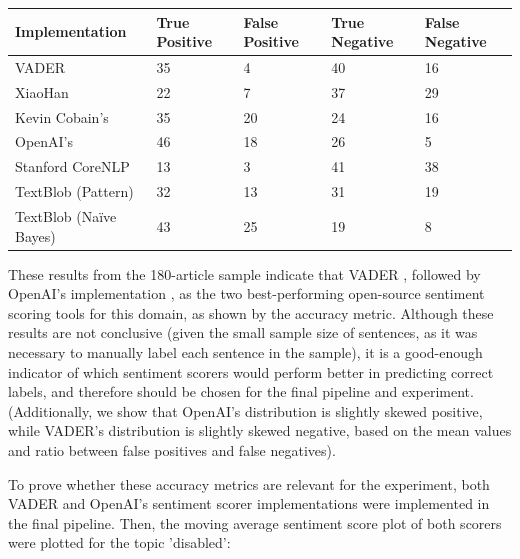 \documentclass{report}
\begin{document}
\vspace{0.5em}
\noindent
\begin{tabu} to 1.0\textwidth { | X[c] | X[c] | X[c] | X[c] | X[c] |}
	\hline
	Implementation & True Positive & False Positive & True Negative & False Negative \\
	\hline
	VADER \cite{VADER} & 35 & 4 & 40 & 16 \\
	\hline
	XiaoHan \cite{kalchbrennerACL2014} & 22 & 7 & 37 & 29 \\
	\hline
	Kevin Cobain's \cite{kevincobain} & 35 & 20 & 24 & 16 \\
	\hline
	OpenAI's \cite{OpenAI} & 46 & 18 & 26 & 5 \\
	\hline
	Stanford CoreNLP \cite{StanfordNLP} & 13 & 3 & 41 & 38 \\
	\hline
	TextBlob \cite{textblob} (Pattern) & 32 & 13 & 31 & 19 \\
	\hline
	TextBlob \cite{textblob} (Na\"{i}ve Bayes) & 43 & 25 & 19 & 8 \\
	\hline
\end{tabu}
\vspace{0.5em}
	
These results from the 180-article sample indicate that VADER \cite{VADER}, followed by OpenAI's implementation \cite{OpenAI}, as the two best-performing open-source sentiment scoring tools for this domain, as shown by the accuracy metric.
Although these results are not conclusive (given the small sample size of sentences, as it was necessary to manually label each sentence in the sample), it is a good-enough indicator of which sentiment scorers would perform better in predicting correct labels, and therefore should be chosen for the final pipeline and experiment.
(Additionally, we show that OpenAI's distribution is slightly skewed positive, while VADER's distribution is slightly skewed negative, based on the mean values and ratio between false positives and false negatives).

To prove whether these accuracy metrics are relevant for the experiment, both VADER and OpenAI's sentiment scorer implementations were implemented in the final pipeline.
Then, the moving average sentiment score plot of both scorers were plotted for the topic 'disabled':
\end{document}
